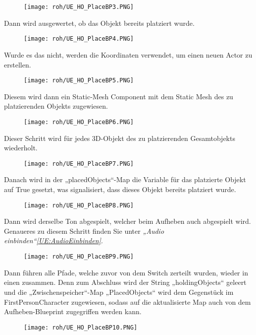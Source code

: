 \begin{figure}[H]
    \centering
    \texttt{[image: roh/UE\_HO\_PlaceBP3.PNG]}
    \label{UE:HO_PlaceBP2_3_2}
\end{figure}
Dann wird ausgewertet, ob das Objekt bereits platziert wurde.
\begin{figure}[H]
    \centering
    \texttt{[image: roh/UE\_HO\_PlaceBP4.PNG]}
    \label{UE:HO_PlaceBP4}
\end{figure}
Wurde es das nicht, werden die Koordinaten verwendet, um einen neuen Actor zu erstellen.
\begin{figure}[H]
    \centering
    \texttt{[image: roh/UE\_HO\_PlaceBP5.PNG]}
    \label{UE:HO_PlaceBP5}
\end{figure}
Diesem wird dann ein Static-Mesh Component mit dem Static Mesh des zu platzierenden Objekts zugewiesen.
\begin{figure}[H]
    \centering
    \texttt{[image: roh/UE\_HO\_PlaceBP6.PNG]}
    \label{UE:HO_PlaceBP6}
\end{figure}
Dieser Schritt wird für jedes 3D-Objekt des zu platzierenden Gesamtobjekts wiederholt.
\begin{figure}[H]
    \centering
    \texttt{[image: roh/UE\_HO\_PlaceBP7.PNG]}
    \label{UE:HO_PlaceBP7}
\end{figure}
Danach wird in der „placedObjects“-Map die Variable für das platzierte Objekt auf True gesetzt, was signalisiert, dass dieses Objekt bereits platziert wurde.
\begin{figure}[H]
    \centering
    \texttt{[image: roh/UE\_HO\_PlaceBP8.PNG]}
    \label{UE:HO_PlaceBP8}
\end{figure}
Dann wird derselbe Ton abgespielt, welcher beim Aufheben auch abgespielt wird. Genaueres zu diesem Schritt finden Sie unter \textit{„Audio einbinden“\ref{UE:AudioEinbinden}}.
\begin{figure}[H]
    \centering
    \texttt{[image: roh/UE\_HO\_PlaceBP9.PNG]}
    \label{UE:HO_PlaceBP9}
\end{figure}
Dann führen alle Pfade, welche zuvor von dem Switch zerteilt wurden, wieder in einen zusammen. Denn zum Abschluss wird der String „holdingObjects“ geleert und die „Zwischenspeicher“-Map „PlacedObjects“ wird dem Gegenstück im FirstPersonCharacter zugewiesen, sodass auf die aktualisierte Map auch von dem Aufheben-Blueprint zugegriffen werden kann.
\begin{figure}[H]
    \centering
    \texttt{[image: roh/UE\_HO\_PlaceBP10.PNG]}
    \label{UE:HO_PlaceBP10}
\end{figure}
